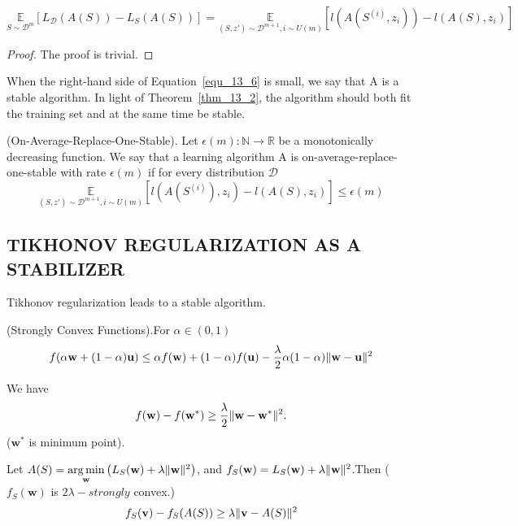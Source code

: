 \begin{thm}
	\begin{equation}
		\label{equ_13_6}
		\underset{S \sim \mathcal{D}^m} {\mathbb{E}}
		[L_{\mathcal{D}}(A(S)) - L_S(A(S))]
		= \underset{(S,z') \sim \mathcal{D}^{m+1}, i \sim U(m)} {\mathbb{E}}
		[l(A(S^{(i)}, z_i)) - l(A(S), z_i)]
	\end{equation}	
	\begin{proof}
		The proof is trivial.
	\end{proof}
\end{thm}
When the right-hand side of Equation~\ref{equ_13_6} is small, we say that A is a stable algorithm.
In light of Theorem~\ref{thm_13_2}, the algorithm should both fit the training set and at the same time be stable.

\begin{defn}
	(On-Average-Replace-One-Stable).
	Let $ \epsilon(m): \mathbb{N} \rightarrow \mathbb{R} $ be a monotonically decreasing function.
	We say that a learning algorithm A is on-average-replace-one-stable with rate $ \epsilon(m) $
	if for every distribution $ \mathcal{D} $
	\begin{equation}
		\underset{(S,z') \sim \mathcal{D}^{m+1}, i \sim U(m)} {\mathbb{E}}
		[l(A(S^{(i)}), z_i) - l(A(S), z_i)] \le \epsilon(m)
	\end{equation}
\end{defn}

\subsection{TIKHONOV REGULARIZATION AS A STABILIZER}

Tikhonov regularization leads to a stable algorithm.
\begin{defn} (Strongly Convex Functions).For $ \alpha \in (0, 1) $
	\begin{equation}
		f( \alpha \mathbf{w} + (1-\alpha) \mathbf{u}) \le
		\alpha f(\mathbf{w}) + (1-\alpha) f(\mathbf{u})
		- \frac{\lambda}{2} \alpha (1-\alpha) \Arrowvert \mathbf{w} - \mathbf{u} \Arrowvert^2
	\end{equation}
\end{defn}

We have
\[ f(\mathbf{w}) - f(\mathbf{w}^*) \ge \frac{\lambda}{2} \Arrowvert \mathbf{w} - \mathbf{w}^* \Arrowvert^2.\]
($\mathbf{w}^*$ is minimum point).

Let $ A(S) = \underset{\mathbf{w}}{\arg\min} \left( L_S(\mathbf{w}) + \lambda \Arrowvert \mathbf{w} \Arrowvert^2 \right) $,
and $ f_S(\mathbf{w}) = L_S(\mathbf{w}) + \lambda \Arrowvert \mathbf{w} \Arrowvert^2 $.Then
($ f_S( \textbf{w}) $ is $ 2\lambda-strongly $ convex.)
\begin{equation}
	\label{equ_13_7}
	f_S(\mathbf{v}) - f_S(A(S)) \ge \lambda \Arrowvert \mathbf{v} - A(S) \Arrowvert^2
\end{equation}

